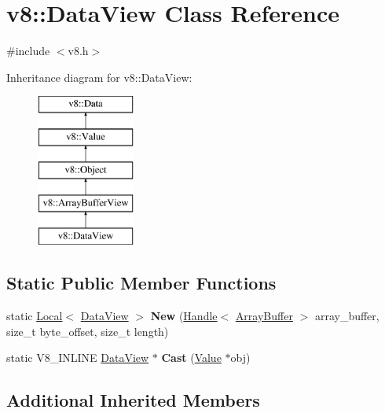 \hypertarget{classv8_1_1_data_view}{}\section{v8\+:\+:Data\+View Class Reference}
\label{classv8_1_1_data_view}


{\ttfamily \#include $<$v8.\+h$>$}

Inheritance diagram for v8\+:\+:Data\+View\+:\begin{figure}[H]
\begin{center}
\leavevmode
\includegraphics[height=5.000000cm]{classv8_1_1_data_view}
\end{center}
\end{figure}
\subsection*{Static Public Member Functions}
\begin{DoxyCompactItemize}
\item 
\hypertarget{classv8_1_1_data_view_a5157c044dbb50669bc2977ea7482aa32}{}static \hyperlink{classv8_1_1_local}{Local}$<$ \hyperlink{classv8_1_1_data_view}{Data\+View} $>$ {\bfseries New} (\hyperlink{classv8_1_1_handle}{Handle}$<$ \hyperlink{classv8_1_1_array_buffer}{Array\+Buffer} $>$ array\+\_\+buffer, size\+\_\+t byte\+\_\+offset, size\+\_\+t length)\label{classv8_1_1_data_view_a5157c044dbb50669bc2977ea7482aa32}

\item 
\hypertarget{classv8_1_1_data_view_aa97d15fcb28c6c002a52d32877c8fd3a}{}static V8\+\_\+\+I\+N\+L\+I\+N\+E \hyperlink{classv8_1_1_data_view}{Data\+View} $\ast$ {\bfseries Cast} (\hyperlink{classv8_1_1_value}{Value} $\ast$obj)\label{classv8_1_1_data_view_aa97d15fcb28c6c002a52d32877c8fd3a}

\end{DoxyCompactItemize}
\subsection*{Additional Inherited Members}


